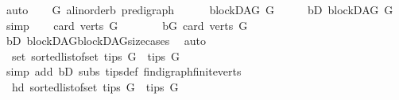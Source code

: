 \begin{isabellebody}
\ auto\isanewline
{}\isamarkupfalse%
\isanewline
\ \ \isamarkupfalse%
\ G\ {\isacharcolon}{\kern0pt}{\isacharcolon}{\kern0pt}{\isachardoublequoteopen}{\isacharparenleft}{\kern0pt}{\isacharprime}{\kern0pt}a{\isacharcolon}{\kern0pt}{\isacharcolon}{\kern0pt}linorder{\isacharcomma}{\kern0pt}{\isacharprime}{\kern0pt}b{\isacharparenright}{\kern0pt}\ pre{\isacharunderscore}{\kern0pt}digraph{\isachardoublequoteclose}\isanewline
\ \ \isamarkupfalse%
\ {\isachardoublequoteopen}{\isasymnot}\ {\isasymnot}\ blockDAG\ G{\isachardoublequoteclose}\isanewline
\ \ \isamarkupfalse%
\ \isamarkupfalse%
\ bD{\isacharcolon}{\kern0pt}\ {\isachardoublequoteopen}blockDAG\ G{\isachardoublequoteclose}\ \isamarkupfalse%
\ simp\isanewline
\ \ \isamarkupfalse%
\ {\isachardoublequoteopen}card\ {\isacharparenleft}{\kern0pt}verts\ G{\isacharparenright}{\kern0pt}\ {\isasymnoteq}\ {}{\isachardoublequoteclose}\isanewline
\ \ \isamarkupfalse%
\ \isamarkupfalse%
\ bG{\isacharcolon}{\kern0pt}\ {\isachardoublequoteopen}card\ {\isacharparenleft}{\kern0pt}verts\ G{\isacharparenright}{\kern0pt}\ {\isachargreater}{\kern0pt}\ {}{\isachardoublequoteclose}\ \isamarkupfalse%
\ bD\ blockDAG{\isachardot}{\kern0pt}blockDAG{\isacharunderscore}{\kern0pt}size{\isacharunderscore}{\kern0pt}cases\ \isamarkupfalse%
\ auto\ \isanewline
\ \ \isamarkupfalse%
\ {\isachardoublequoteopen}\ set\ {\isacharparenleft}{\kern0pt}sorted{\isacharunderscore}{\kern0pt}list{\isacharunderscore}{\kern0pt}of{\isacharunderscore}{\kern0pt}set\ {\isacharparenleft}{\kern0pt}tips\ G{\isacharparenright}{\kern0pt}{\isacharparenright}{\kern0pt}\ {\isacharequal}{\kern0pt}\ tips\ G{\isachardoublequoteclose}\ \ \isanewline
\ \ \ \ \isamarkupfalse%
\ {\isacharparenleft}{\kern0pt}simp\ add{\isacharcolon}{\kern0pt}\ bD\ subs\ tips{\isacharunderscore}{\kern0pt}def\ fin{\isacharunderscore}{\kern0pt}digraph{\isachardot}{\kern0pt}finite{\isacharunderscore}{\kern0pt}verts{\isacharparenright}{\kern0pt}\isanewline
\ \ \isamarkupfalse%
\ \isamarkupfalse%
\ {\isachardoublequoteopen}\ hd\ {\isacharparenleft}{\kern0pt}sorted{\isacharunderscore}{\kern0pt}list{\isacharunderscore}{\kern0pt}of{\isacharunderscore}{\kern0pt}set\ {\isacharparenleft}{\kern0pt}tips\ G{\isacharparenright}{\kern0pt}{\isacharparenright}{\kern0pt}\ {\isasymin}\ tips\ G{\isachardoublequoteclose}\ \ \isanewline
\ \ \ \ \isamarkupfalse%

\end{isabellebody}
